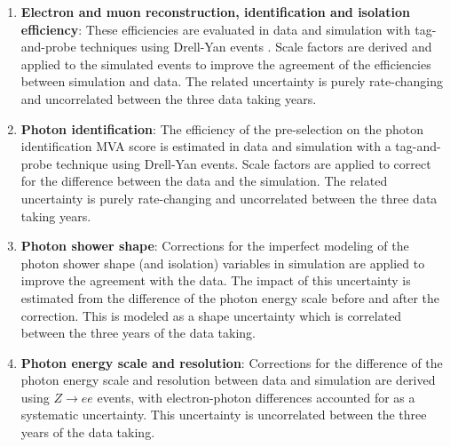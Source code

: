 \begin{enumerate}
  \item \textbf{Electron and muon reconstruction, identification and isolation efficiency}: These efficiencies are evaluated in data and simulation with tag-and-probe techniques using Drell-Yan events \cite{Khachatryan:2015hwa, Sirunyan:2018fpa}. Scale factors are derived and applied to the simulated events to improve the agreement of the efficiencies between simulation and data. The related uncertainty is purely rate-changing and uncorrelated between the three data taking years.

  \item \textbf{Photon identification}: The efficiency of the pre-selection on the photon identification MVA score is estimated in data and simulation with a tag-and-probe technique using Drell-Yan events. Scale factors are applied to correct for the difference between the data and the simulation. The related uncertainty is purely rate-changing  and uncorrelated between the three data taking years.


  \item \textbf{Photon shower shape}: Corrections for the imperfect modeling of the photon shower shape (and isolation) variables in simulation are applied to improve the agreement with the data. The impact of this uncertainty is estimated from the difference of the photon energy scale before and after the correction. This is modeled as a shape uncertainty which is correlated between the three years of the data taking.

  \item \textbf{Photon energy scale and resolution}: Corrections for the difference of the photon energy scale and resolution between data and simulation are derived using $Z \rightarrow ee$ events, with electron-photon differences accounted for as a systematic uncertainty. This uncertainty is uncorrelated between the three years of the data taking.



\end{enumerate}
